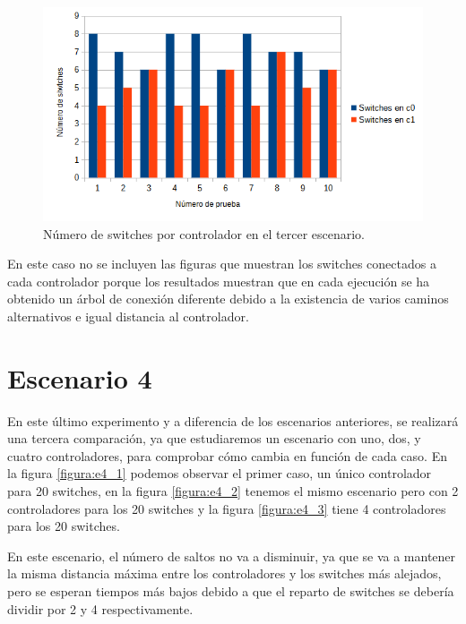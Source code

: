 \documentclass[a4paper, 12pt]{book}
\begin{document}
 	
 	\begin{figure}[H]
 		\centering
 		\includegraphics[width=14cm, keepaspectratio]{img/switchesporcontrollerescenario3}
 		\caption{Número de switches por controlador en el tercer escenario.}
 		\label{figura:switchesporcontrollerb4}
 	\end{figure}
 	
 	En este caso no se incluyen las figuras que muestran los switches conectados a cada controlador porque los resultados muestran que en cada ejecución se ha obtenido un árbol de conexión diferente debido a la existencia de varios caminos alternativos e igual distancia al controlador.
	
	\clearpage
	\section{Escenario 4}
	
	En este último experimento y a diferencia de los escenarios anteriores, se realizará una tercera comparación, ya que estudiaremos un escenario con uno, dos, y cuatro controladores, para comprobar cómo cambia en función de cada caso.
	En la figura \ref{figura:e4_1} podemos observar el primer caso, un único controlador para 20 switches, en la figura \ref{figura:e4_2} tenemos el mismo escenario pero con 2 controladores para los 20 switches y la figura \ref{figura:e4_3} tiene 4 controladores para los 20 switches.
	
	En este escenario, el número de saltos no va a disminuir, ya que se va a mantener la misma distancia máxima entre los controladores y los switches más alejados, pero se esperan tiempos más bajos debido a que el reparto de switches se debería dividir por 2 y 4 respectivamente.
	
\end{document}
